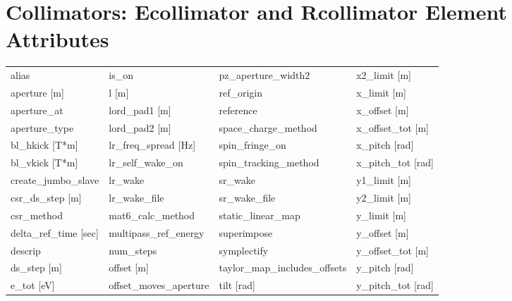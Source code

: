  \section{Collimators: Ecollimator and Rcollimator Element Attributes}
 \label{s:list.collimator}
 
 \begin{tabular}{llll} \toprule
alias                            & is_on                            & pz_aperture_width2               & x2_limit [m]                     \\
aperture [m]                     & l [m]                            & ref_origin                       & x_limit [m]                      \\
aperture_at                      & lord_pad1 [m]                    & reference                        & x_offset [m]                     \\
aperture_type                    & lord_pad2 [m]                    & space_charge_method              & x_offset_tot [m]                 \\
bl_hkick [T*m]                   & lr_freq_spread [Hz]              & spin_fringe_on                   & x_pitch [rad]                    \\
bl_vkick [T*m]                   & lr_self_wake_on                  & spin_tracking_method             & x_pitch_tot [rad]                \\
create_jumbo_slave               & lr_wake                          & sr_wake                          & y1_limit [m]                     \\
csr_ds_step [m]                  & lr_wake_file                     & sr_wake_file                     & y2_limit [m]                     \\
csr_method                       & mat6_calc_method                 & static_linear_map                & y_limit [m]                      \\
delta_ref_time [sec]             & multipass_ref_energy             & superimpose                      & y_offset [m]                     \\
descrip                          & num_steps                        & symplectify                      & y_offset_tot [m]                 \\
ds_step [m]                      & offset [m]                       & taylor_map_includes_offsets      & y_pitch [rad]                    \\
e_tot [eV]                       & offset_moves_aperture            & tilt [rad]                       & y_pitch_tot [rad]                \\

\end{tabular}
